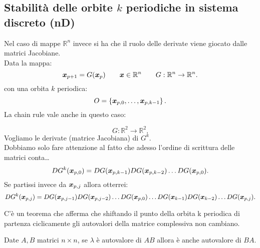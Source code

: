 \subsection{Stabilità delle orbite $k$ periodiche in sistema discreto (nD)}%
Nel caso di mappe $\mathbb{R}^n$ invece si ha che il ruolo delle derivate viene giocato dalle matrici Jacobiane.\\
Data la mappa:
\[
    \boldsymbol{x}_{p+1}=G(\boldsymbol{x}_{p}) \qquad  \boldsymbol{x}\in \mathbb{R}^n \qquad  G:\mathbb{R}^n\to \mathbb{R}^n
.\] 
con una orbita $k$ periodica:
\[
    O = \left\{\boldsymbol{x}_{p, 0}, \ldots, \boldsymbol{x}_{p, k-1}\right\}
.\] 
La chain rule vale anche in questo caso:
\begin{exmp}
    \[
        G:\mathbb{R}^2\to \mathbb{R}^2
    .\] 
    Vogliamo le derivate (matrice Jacobiana) di $G^k$.\\
    Dobbiamo solo fare attenzione al fatto che adesso l'ordine di scrittura delle matrici conta\ldots
    \[
	DG^k(\boldsymbol{x}_{p, 0}) = DG(\boldsymbol{x}_{p, k-1}) DG(\boldsymbol{x}_{p, k-2})\ldots DG(\boldsymbol{x}_{p, 0}) 
    .\] 
    Se partissi invece da $\boldsymbol{x}_{p, j}$ allora otterrei:
    \[
	DG^{k}(\boldsymbol{x}_{p, j}) = DG(\boldsymbol{x}_{p, j-1}) DG(\boldsymbol{x}_{p, j-2})\ldots DG(\boldsymbol{x}_{p, 0}) \ldots DG(\boldsymbol{x}_{k-1}) DG(\boldsymbol{x}_{k-2}) \ldots DG(\boldsymbol{x}_{p, j}) 
    .\] 
\end{exmp}
\noindent
C'è un teorema che afferma che shiftando il punto della orbita k periodica di partenza ciclicamente gli autovalori della matrice complessiva non cambiano.
\begin{thm}
    Date $A, B$ matrici $n\times n$, se $\lambda$ è autovalore di $AB$ allora è anche autovalore di $BA$. 
\end{thm}
